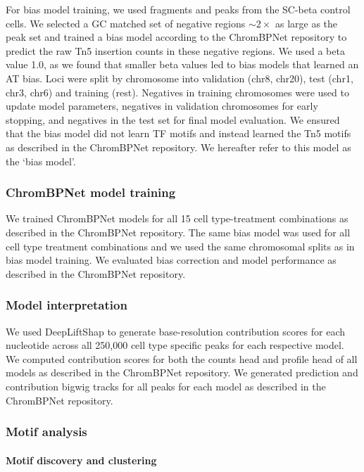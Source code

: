 For bias model training, we used fragments and peaks from the SC-beta control cells. We selected a GC matched set of negative regions \(\sim2\times\) as large as the peak set and trained a bias model according to the ChromBPNet repository \cite{Pampari2025-lm} to predict the raw Tn5 insertion counts in these negative regions. We used a beta value 1.0, as we found that smaller beta values led to bias models that learned an AT bias. Loci were split by chromosome into validation (chr8, chr20), test (chr1, chr3, chr6) and training (rest). Negatives in training chromosomes were used to update model parameters, negatives in validation chromosomes for early stopping, and negatives in the test set for final model evaluation. We ensured that the bias model did not learn TF motifs and instead learned the Tn5 motifs as described in the ChromBPNet repository. We hereafter refer to this model as the ‘bias model’.

\subsubsection*{ChromBPNet model training}

We trained ChromBPNet models for all 15 cell type-treatment combinations as described in the ChromBPNet repository. The same bias model was used for all cell type treatment combinations and we used the same chromosomal splits as in bias model training. We evaluated bias correction and model performance as described in the ChromBPNet repository.

\subsubsection*{Model interpretation}

We used DeepLiftShap \cite{Shrikumar2017-og} to generate base-resolution contribution scores for each nucleotide across all 250,000 cell type specific peaks for each respective model. We computed contribution scores for both the counts head and profile head of all models as described in the ChromBPNet repository. We generated prediction and contribution bigwig tracks for all peaks for each model as described in the ChromBPNet repository.

\subsubsection*{Motif analysis}

\paragraph{Motif discovery and clustering}

